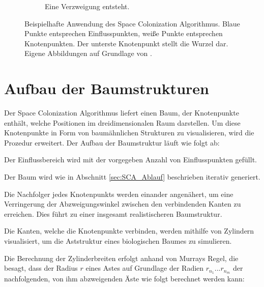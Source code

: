 \begin{figure} [hbtp]
\begin{subfigure}[t]{.31\textwidth}
		\caption{Eine Verzweigung entsteht.}
		\label{subfig:SCA_Basic8}
	\end{subfigure}
	\caption{Beispielhafte Anwendung des Space Colonization Algorithmus. Blaue Punkte entsprechen Einflusspunkten, weiße Punkte entsprechen Knotenpunkten. Der unterste Knotenpunkt stellt die Wurzel dar. Eigene Abbildungen auf Grundlage von \cite[Abb. 2]{SpaceColonizationAlgorithm:07}.}\label{fig:SCA_Basic}
	
\end{figure}


\section{Aufbau der Baumstrukturen}
\label{sec:ModellierungBaumstrukturen}
Der Space Colonization Algorithmus liefert einen Baum, der Knotenpunkte enthält, welche Positionen im dreidimensionalen Raum darstellen. Um diese Knotenpunkte in Form von baumähnlichen Strukturen zu visualisieren, wird die Prozedur erweitert. Der Aufbau der Baumstruktur läuft wie folgt ab:

\begin{description}[labelindent]
	\item[\boldmath$1.$] Der Einflussbereich wird mit der vorgegeben Anzahl von Einflusspunkten gefüllt. \cite[Abschn. 2]{SpaceColonizationAlgorithm:07} \\

	\item[\boldmath$2.$] Der Baum wird wie in Abschnitt \ref{sec:SCA_Ablauf} beschrieben iterativ generiert. \cite[Abschn. 2]{SpaceColonizationAlgorithm:07} \\

	\item[\boldmath$3.$] Die Nachfolger jedes Knotenpunkts werden einander angenähert, um eine Verringerung der Abzweigungswinkel zwischen den verbindenden Kanten zu erreichen. Dies führt zu einer insgesamt realistischeren Baumstruktur. \cite[Abschn. 2]{SpaceColonizationAlgorithm:07} \\
	
	\item[\boldmath$4.$] Die Kanten, welche die Knotenpunkte verbinden, werden mithilfe von Zylindern visualisiert, um die Aststruktur eines biologischen Baumes zu simulieren. \cite[Abschn. 2]{SpaceColonizationAlgorithm:07} 
	
\end{description}

Die Berechnung der Zylinderbreiten erfolgt anhand von Murrays Regel, die besagt, dass der Radius $r$ eines Astes auf Grundlage der Radien $r_{n_1}...r_{n_m}$ der nachfolgenden, von ihm abzweigenden Äste wie folgt berechnet werden kann: 

